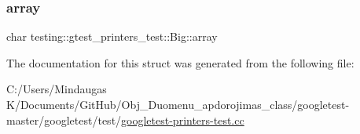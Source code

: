 \subsubsection{\texorpdfstring{array}{array}}
{\footnotesize\ttfamily char testing\+::gtest\+\_\+printers\+\_\+test\+::\+Big\+::array}



The documentation for this struct was generated from the following file\+:\begin{DoxyCompactItemize}
\item 
C\+:/\+Users/\+Mindaugas K/\+Documents/\+Git\+Hub/\+Obj\+\_\+\+Duomenu\+\_\+apdorojimas\+\_\+class/googletest-\/master/googletest/test/\mbox{\hyperlink{googletest-master_2googletest_2test_2googletest-printers-test_8cc}{googletest-\/printers-\/test.\+cc}}\end{DoxyCompactItemize}
